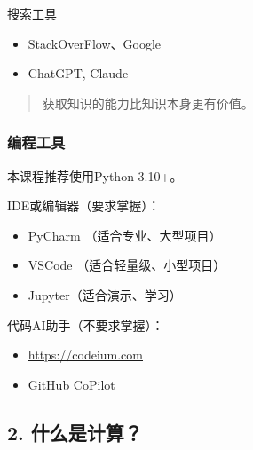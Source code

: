 \documentclass[aspectratio=169, 14pt]{beamer}
\begin{document}
\begin{frame}{搜索工具}

	\begin{itemize}
		\item StackOverFlow、Google
		\item ChatGPT, Claude
	\end{itemize}

	\begin{quote}
		获取知识的能力比知识本身更有价值。
	\end{quote}

\end{frame}
\begin{frame}
	\frametitle{编程工具}
	本课程推荐使用\alert{Python 3.10+}。

	IDE或编辑器（要求掌握）：
	\begin{itemize}
		\item PyCharm （适合专业、大型项目）
		\item VSCode （适合轻量级、小型项目）
		\item Jupyter（适合演示、学习）
	\end{itemize}

	代码AI助手（不要求掌握）：
	\begin{itemize}
		\item \url{https://codeium.com}
		\item GitHub CoPilot
	\end{itemize}
\end{frame}

{
\begin{frame}
	\section{\textcolor{darkmidnightblue}{2. 什么是计算？}}
\end{frame}
}
\end{document}
